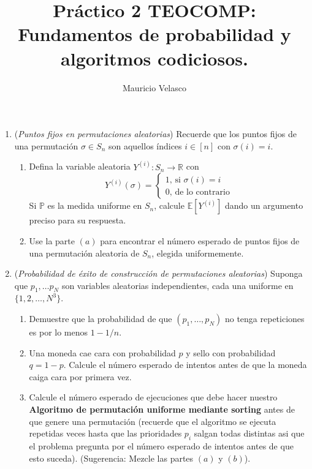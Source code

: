 \documentclass[12pt, a4paper]{article}
\date{}
\newcommand{\RR}{\mathbb{R}}
\newcommand{\EE}{\mathbb{E}}
\begin{document}
\title{Pr\'actico 2 TEOCOMP: Fundamentos de probabilidad y algoritmos codiciosos.}
\author{Mauricio Velasco}
\maketitle{}


\begin{enumerate}
\item ({\it Puntos fijos en permutaciones aleatorias}) Recuerde que los puntos fijos de una permutación $\sigma\in S_n$ son aquellos índices $i\in [n]$ con $\sigma(i)=i$.
\begin{enumerate}
\item Defina la variable aleatoria $Y^{(i)}:S_n\rightarrow \RR$ con 
\[Y^{(i)}(\sigma)=
\begin{cases}
1\text{, si $\sigma(i)=i$}\\
0\text{, de lo contrario}
\end{cases}
\]
Si $\mathbb{P}$ es la medida uniforme en $S_n$, calcule $\EE[Y^{(i)}]$ dando un argumento preciso para su respuesta.
\item Use la parte $(a)$ para encontrar el número esperado de puntos fijos de una permutación aleatoria de $S_n$, elegida uniformemente.
\end{enumerate}


\item ({\it Probabilidad de éxito de construcción de permutaciones aleatorias}) Suponga que $p_1,\dots p_N$ son variables aleatorias independientes, cada una uniforme en $\{1,2,\dots, N^3\}$.
\begin{enumerate}
\item Demuestre que la probabilidad de que $(p_1,\dots,p_N)$ no tenga repeticiones es por lo menos $1-1/n$.
\item Una moneda cae cara con probabilidad $p$ y sello con probabilidad $q=1-p$. Calcule el número esperado de intentos antes de que la moneda caiga cara por primera vez.
\item Calcule el número esperado de ejecuciones que debe hacer nuestro {\bf Algoritmo de permutación uniforme mediante sorting} antes de que genere una permutación (recuerde que el algoritmo se ejecuta repetidas veces hasta que las prioridades $p_i$ salgan todas distintas asi que el problema pregunta por el número esperado de intentos antes de que esto suceda). (Sugerencia: Mezcle las partes $(a)$ y $(b)$).
\end{enumerate}


\end{enumerate}
\end{document}
